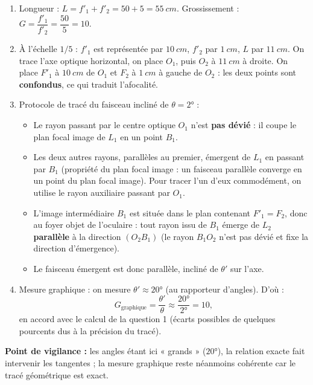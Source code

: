 \documentclass[11pt]{article}
\begin{document}
\begin{corrige}
\begin{enumerate}
\item Longueur : $L = f'_1 + f'_2 = 50 + 5 = \SI{55}{cm}$. Grossissement : $G = \dfrac{f'_1}{f'_2} = \dfrac{50}{5} = 10$.
\item À l'échelle $1/5$ : $f'_1$ est représentée par $\SI{10}{cm}$, $f'_2$ par $\SI{1}{cm}$, $L$ par $\SI{11}{cm}$. On trace l'axe optique horizontal, on place $O_1$, puis $O_2$ à $\SI{11}{cm}$ à droite. On place $F'_1$ à $\SI{10}{cm}$ de $O_1$ et $F_2$ à $\SI{1}{cm}$ à gauche de $O_2$ : les deux points sont \textbf{confondus}, ce qui traduit l'afocalité.
\item Protocole de tracé du faisceau incliné de $\theta = 2°$ :
\begin{itemize}
\item Le rayon passant par le centre optique $O_1$ n'est \textbf{pas dévié} : il coupe le plan focal image de $L_1$ en un point $B_1$.
\item Les deux autres rayons, parallèles au premier, émergent de $L_1$ en passant par $B_1$ (propriété du plan focal image : un faisceau parallèle converge en un point du plan focal image). Pour tracer l'un d'eux commodément, on utilise le rayon auxiliaire passant par $O_1$.
\item L'image intermédiaire $B_1$ est située dans le plan contenant $F'_1 = F_2$, donc au foyer objet de l'oculaire : tout rayon issu de $B_1$ émerge de $L_2$ \textbf{parallèle} à la direction $(O_2B_1)$ (le rayon $B_1O_2$ n'est pas dévié et fixe la direction d'émergence).
\item Le faisceau émergent est donc parallèle, incliné de $\theta'$ sur l'axe.
\end{itemize}
\item Mesure graphique : on mesure $\theta' \approx 20°$ (au rapporteur d'angles). D'où :
\[ G_{\text{graphique}} = \dfrac{\theta'}{\theta} \approx \dfrac{20°}{2°} = 10, \]
en accord avec le calcul de la question 1 (écarts possibles de quelques pourcents dus à la précision du tracé).
\end{enumerate}
\textbf{Point de vigilance :} les angles étant ici « grands » ($20°$), la relation exacte fait intervenir les tangentes ; la mesure graphique reste néanmoins cohérente car le tracé géométrique est exact.
\end{corrige}
\end{document}
